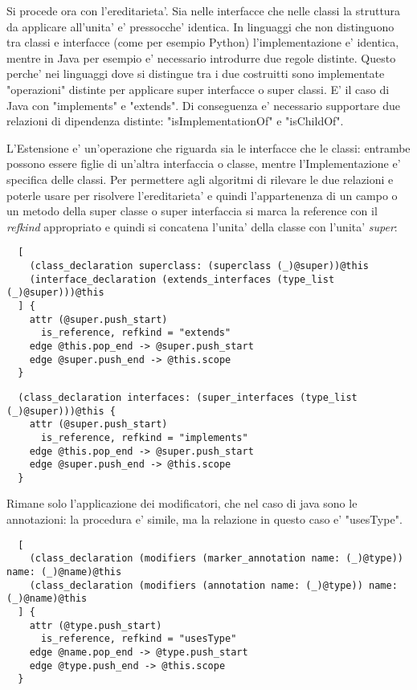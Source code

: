 Si procede ora con l'ereditarieta'.
Sia nelle interfacce che nelle classi la struttura da applicare all'unita' e' pressocche' identica. In linguaggi che non distinguono tra classi e interfacce (come per esempio Python) l'implementazione e' identica, mentre in Java per esempio e' necessario introdurre due regole distinte. Questo perche' nei linguaggi dove si distingue tra i due costruitti sono implementate "operazioni" distinte per applicare super interfacce o super classi. E' il caso di Java con "implements" e "extends". Di conseguenza e' necessario supportare due relazioni di dipendenza distinte: "isImplementationOf" e "isChildOf".

L'Estensione e' un'operazione che riguarda sia le interfacce che le classi: entrambe possono essere figlie di un'altra interfaccia o classe, mentre l'Implementazione e' specifica delle classi.
Per permettere agli algoritmi di rilevare le due relazioni e poterle usare per risolvere l'ereditarieta' e quindi l'appartenenza di un campo o un metodo della super classe o super interfaccia si marca la reference con il \emph{refkind} appropriato e quindi si concatena l'unita' della classe con l'unita' \emph{super}:

\begin{lstlisting}
  [
    (class_declaration superclass: (superclass (_)@super))@this
    (interface_declaration (extends_interfaces (type_list (_)@super)))@this
  ] {
    attr (@super.push_start)
      is_reference, refkind = "extends"
    edge @this.pop_end -> @super.push_start
    edge @super.push_end -> @this.scope
  }
\end{lstlisting}

\begin{lstlisting}
  (class_declaration interfaces: (super_interfaces (type_list (_)@super)))@this {
    attr (@super.push_start)
      is_reference, refkind = "implements"
    edge @this.pop_end -> @super.push_start
    edge @super.push_end -> @this.scope
  }
\end{lstlisting}

Rimane solo l'applicazione dei modificatori, che nel caso di java sono le annotazioni: la procedura e' simile, ma la relazione in questo caso e' "usesType".

\begin{lstlisting}
  [
    (class_declaration (modifiers (marker_annotation name: (_)@type)) name: (_)@name)@this
    (class_declaration (modifiers (annotation name: (_)@type)) name: (_)@name)@this
  ] {
    attr (@type.push_start)
      is_reference, refkind = "usesType"
    edge @name.pop_end -> @type.push_start
    edge @type.push_end -> @this.scope
  }
\end{lstlisting}

